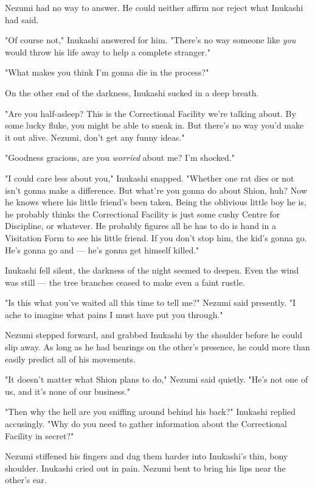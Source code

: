 Nezumi had no way to answer. He could neither affirm nor reject what
Inukashi had said.

"Of course not," Inukashi answered for him. "There's no way someone like
\emph{you} would throw his life away to help a complete stranger."

"What makes you think I'm gonna die in the process?"

On the other end of the darkness, Inukashi sucked in a deep breath.

"Are you half-asleep? This is the Correctional Facility we're talking
about. By some lucky fluke, you might be able to sneak in. But there's
no way you'd make it out alive. Nezumi, don't get any funny ideas."

"Goodness gracious, are you \emph{worried} about me? I'm shocked."

"I could care less about you," Inukashi snapped. "Whether one rat dies
or not isn't gonna make a difference. But what're you gonna do about
Shion, huh? Now he knows where his little friend's been taken. Being the
oblivious little boy he is, he probably thinks the Correctional Facility
is just some cushy Centre for Discipline, or whatever. He probably
figures all he has to do is hand in a Visitation Form to see his little
friend. If you don't stop him, the kid's gonna go. He's gonna go and ---
he's gonna get himself killed."

Inukashi fell silent, the darkness of the night seemed to deepen. Even
the wind was still --- the tree branches ceased to make even a faint
rustle.

"Is this what you've waited all this time to tell me?" Nezumi said
presently. "I ache to imagine what pains I must have put you through."

Nezumi stepped forward, and grabbed Inukashi by the shoulder before he
could slip away. As long as he had bearings on the other's presence, he
could more than easily predict all of his movements.

"It doesn't matter what Shion plans to do," Nezumi said quietly. "He's
not one of us, and it's none of our business."

"Then why the hell are you sniffing around behind his back?" Inukashi
replied accusingly. "Why do you need to gather information about the
Correctional Facility in secret?"

Nezumi stiffened his fingers and dug them harder into Inukashi's thin,
bony shoulder. Inukashi cried out in pain. Nezumi bent to bring his lips
near the other's ear.

